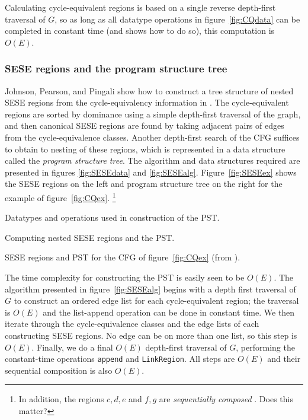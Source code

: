 \documentclass[12pt,titlepage,twoside]{article}
\newcommand*{\figscale}{1.0}
\begin{document}
Calculating cycle-equivalent regions is based on a single reverse
depth-first traversal of $G$, so as long as all datatype operations in
figure~\ref{fig:CQdata} can be completed in constant time (and
\cite{johnson93:sese} shows how to do so), this computation is $O(E)$.

\subsubsection{SESE regions and the program structure tree}
Johnson, Pearson, and Pingali show how to construct a tree structure
of nested SESE regions from the cycle-equivalency information in
\cite{johnson94:pst}.  The cycle-equivalent regions are sorted by
dominance using a simple depth-first traversal of the graph, and then
canonical SESE regions are found by taking adjacent pairs of
edges from the cycle-equivalence classes.  Another depth-first search
of the CFG suffices to obtain to nesting of these regions,
which is represented in a data structure called the 
\emph{program structure tree}.
The algorithm and data structures required are presented in figures
\ref{fig:SESEdata} and \ref{fig:SESEalg}.  Figure~\vref{fig:SESEex}
shows the SESE regions on the left and program structure tree on
the right for the example of figure~\vref{fig:CQex}.%
\footnote{In addition, the regions ${c,d,e}$ and ${f,g}$ are
\emph{sequentially composed} \cite{johnson94:pst}.  Does this matter?}

\begin{myfigure}\small
\caption{Datatypes and operations used in construction of the PST.}
\label{fig:SESEdata}\end{myfigure}

\begin{myfigure}\small\linespread{0.75}
\caption{Computing nested SESE regions and the PST.}
\label{fig:SESEalg}\end{myfigure}

\begin{myfigure}\centering
\vertcenter{\renewcommand*{\figscale}{0.5}}\hspace{1cm}
\vertcenter{\renewcommand*{\figscale}{0.7}}
\caption{SESE regions and PST for the CFG of
         figure~\ref{fig:CQex} (from \cite{johnson94:pst}).}
\label{fig:SESEex}\end{myfigure}

The time complexity for constructing the PST is easily seen to be
$O(E)$. The algorithm presented in figure~\vref{fig:SESEalg} begins
with a depth first traversal of $G$ to construct an ordered edge list
for each cycle-equivalent region; the traversal is $O(E)$ and the
list-append operation can be done in constant time.  We then iterate
through the cycle-equivalence classes and the edge lists of each
constructing SESE regions.  No edge can be on more than one list, so
this step is $O(E)$.  Finally, we do a final $O(E)$ depth-first
traversal of $G$, performing the constant-time operations {\tt append}
and {\tt LinkRegion}.  All steps are $O(E)$ and their sequential
composition is also $O(E)$.
\end{document}
